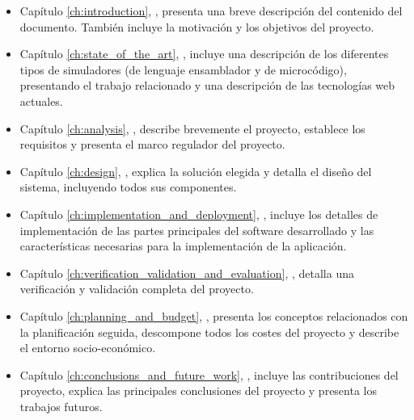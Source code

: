 \begin{itemize}

\item Capítulo \ref{ch:introduction}, \textit{}, presenta una breve descripción del contenido del documento. También incluye la motivación y los objetivos del proyecto.

\item Capítulo \ref{ch:state_of_the_art}, \textit{}, incluye una descripción de los diferentes tipos de simuladores (de lenguaje ensamblador y de microcódigo), presentando el trabajo relacionado y una descripción de las tecnologías web actuales.

\item Capítulo \ref{ch:analysis}, \textit{}, describe brevemente el proyecto, establece los requisitos y presenta el marco regulador del proyecto.

\item Capítulo \ref{ch:design}, \textit{}, explica la solución elegida y detalla el diseño del sistema, incluyendo todos sus componentes.

\item Capítulo \ref{ch:implementation_and_deployment}, \textit{}, incluye los detalles de implementación de las partes principales del software desarrollado y las características necesarias para la implementación de la aplicación.

\item Capítulo \ref{ch:verification_validation_and_evaluation}, \textit{}, detalla una verificación y validación completa del proyecto.

\item Capítulo \ref{ch:planning_and_budget}, \textit{}, presenta los conceptos relacionados con la planificación seguida, descompone todos los costes del proyecto y describe el entorno socio-económico.

\item Capítulo \ref{ch:conclusions_and_future_work}, \textit{}, incluye las contribuciones del proyecto, explica las principales conclusiones del proyecto y presenta los trabajos futuros.

\end{itemize}

